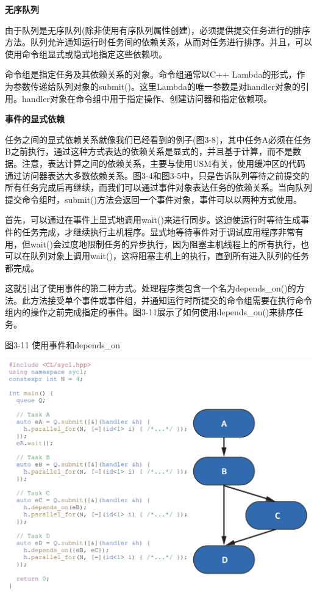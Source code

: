\hspace*{\fill} \par %
\textbf{无序队列}

由于队列是无序队列(除非使用有序队列属性创建)，必须提供提交任务进行的排序方法。队列允许通知运行时任务间的依赖关系，从而对任务进行排序。并且，可以使用命令组显式或隐式地指定这些依赖项。\par

命令组是指定任务及其依赖关系的对象。命令组通常以C++ Lambda的形式，作为参数传递给队列对象的submit()。这里Lambda的唯一参数是对handler对象的引用。handler对象在命令组中用于指定操作、创建访问器和指定依赖项。\par

\hspace*{\fill} \par %
\textbf{事件的显式依赖}

任务之间的显式依赖关系就像我们已经看到的例子(图3-8)，其中任务A必须在任务B之前执行，通过这种方式表达的依赖关系是显式的，并且基于计算，而不是数据。注意，表达计算之间的依赖关系，主要与使用USM有关，使用缓冲区的代码通过访问器表达大多数依赖关系。图3-4和图3-5中，只是告诉队列等待之前提交的所有任务完成后再继续，而我们可以通过事件对象表达任务的依赖关系。当向队列提交命令组时，submit()方法会返回一个事件对象，事件可以以两种方式使用。\par

首先，可以通过在事件上显式地调用wait()来进行同步。这迫使运行时等待生成事件的任务完成，才继续执行主机程序。显式地等待事件对于调试应用程序非常有用，但wait()会过度地限制任务的异步执行，因为阻塞主机线程上的所有执行，也可以在队列对象上调用wait()，这将阻塞主机上的执行，直到所有进入队列的任务都完成。\par

这就引出了使用事件的第二种方式。处理程序类包含一个名为depends\_on()的方法。此方法接受单个事件或事件组，并通知运行时所提交的命令组需要在执行命令组内的操作之前完成指定的事件。图3-11展示了如何使用depends\_on()来排序任务。\par

\hspace*{\fill} \par %
图3-11 使用事件和depends\_on
\begin{center}
	\includegraphics[width=1.0\textwidth]{content/chapter-3/images/7}
\end{center}


